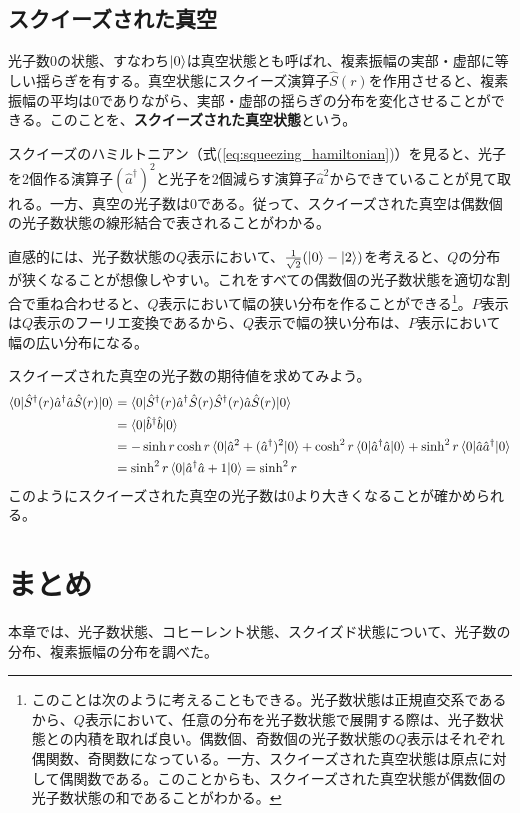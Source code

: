 \subsection{スクイーズされた真空}
光子数0の状態、すなわち$\ket 0$は真空状態とも呼ばれ、複素振幅の実部・虚部に等しい揺らぎを有する。真空状態にスクイーズ演算子$\hat S(r)$を作用させると、複素振幅の平均は0でありながら、実部・虚部の揺らぎの分布を変化させることができる。このことを、\textbf{スクイーズされた真空状態}という。

スクイーズのハミルトニアン（式(\ref{eq:squeezing_hamiltonian})）を見ると、光子を2個作る演算子$(\hat a^\dagger)^2$と光子を2個減らす演算子$\hat a^2$からできていることが見て取れる。一方、真空の光子数は0である。従って、スクイーズされた真空は偶数個の光子数状態の線形結合で表されることがわかる。

直感的には、光子数状態の$Q$表示において、$\frac{1}{\sqrt 2}(\ket 0 - \ket 2)$を考えると、$Q$の分布が狭くなることが想像しやすい。これをすべての偶数個の光子数状態を適切な割合で重ね合わせると、$Q$表示において幅の狭い分布を作ることができる\footnote{このことは次のように考えることもできる。光子数状態は正規直交系であるから、$Q$表示において、任意の分布を光子数状態で展開する際は、光子数状態との内積を取れば良い。偶数個、奇数個の光子数状態の$Q$表示はそれぞれ偶関数、奇関数になっている。一方、スクイーズされた真空状態は原点に対して偶関数である。このことからも、スクイーズされた真空状態が偶数個の光子数状態の和であることがわかる。}。$P$表示は$Q$表示のフーリエ変換であるから、$Q$表示で幅の狭い分布は、$P$表示において幅の広い分布になる。

スクイーズされた真空の光子数の期待値を求めてみよう。
\begin{equation}
\begin{aligned}
  \braket{0|\hat S^\dagger (r) \hat a ^\dagger \hat a \hat S (r) | 0} &= \braket{0|\hat S^\dagger (r) \hat a ^\dagger \hat S(r) \hat S^\dagger(r) \hat a \hat S (r) | 0}\\
  &= \braket{0|\hat b^\dagger \hat b|0}\\
  &= -\sinh r \cosh r\braket{0|\hat a^2 + (\hat a^\dagger)^2|0} + \cosh^2 r \braket{0|\hat a^\dagger \hat a|0} + \sinh^2 r \braket{0|\hat a \hat a^\dagger|0}\\
  &=\sinh^2 r \braket{0|\hat a^\dagger \hat a + 1|0} = \sinh^2 r
\end{aligned}
\end{equation}
このようにスクイーズされた真空の光子数は0より大きくなることが確かめられる。



\section{まとめ}
本章では、光子数状態、コヒーレント状態、スクイズド状態について、光子数の分布、複素振幅の分布を調べた。


